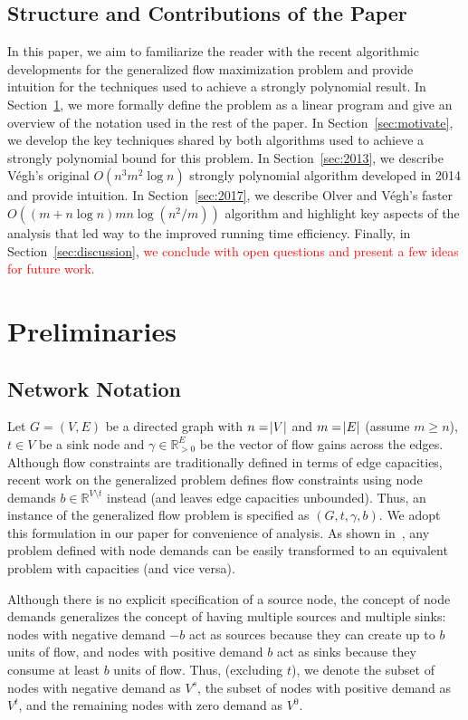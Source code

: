 \documentclass[11pt]{article}
\theoremstyle{definition}
\theoremstyle{definition}
\theoremstyle{definition}
\newcommand{\R}{\mathbb{R}}
\newcommand{\vsrc}{V^{s}}
\newcommand{\vsink}{V^{t}}
\newcommand{\vz}{V^{0}}
\newcommand{\rewrite}[1]{\textcolor{red}{#1}}
\begin{document}
	\subsection{Structure and Contributions of the Paper}\label{sec:structure}
	In this paper, we aim to
	familiarize the reader with the recent algorithmic developments for the
	generalized flow maximization problem and provide intuition for the techniques
	used to achieve a strongly polynomial result. In Section~\ref{sec:prelim}, we more formally
	define the problem as a linear program and give an overview of the notation
	used in the rest of the paper. In Section~\ref{sec:motivate}, we develop the key techniques
	shared by both algorithms used to achieve a strongly polynomial bound for this
	problem. In Section~\ref{sec:2013}, we describe Végh's original $O(n^3m^2 \log n)$ strongly
	polynomial algorithm developed in 2014 and provide intuition. In Section~\ref{sec:2017}, we describe Olver and
	Végh's faster $O((m + n\log n)mn\log(n^2 / m))$ algorithm and highlight key
	aspects of the analysis that led way to the improved running time efficiency.
	Finally, in Section~\ref{sec:discussion}, 
    \rewrite{we conclude with open questions and present a few ideas
	for future work.}
    
\section{Preliminaries}\label{sec:prelim}

	\subsection{Network Notation}\label{sec:notation}
	Let $G=(V,E)$ be a directed graph with $n=\abs{V}$ and $m=\abs{E}$ (assume
	$m \geq n$), $t \in V$ be a sink node and $\gamma \in \R_{>0}^E$ be the vector of flow gains
	across the edges. Although flow constraints are traditionally defined in terms of
	edge capacities, recent work on the generalized problem defines flow
	constraints using node demands $b \in \R^{V \setminus t}$ instead (and leaves
	edge capacities unbounded). Thus, an instance of the generalized flow problem
	is specified as $(G, t, \gamma, b)$.
	We adopt this formulation in our paper for
	convenience of analysis. As shown in~\cite{Vegh2013}, any problem defined with
	node demands can be easily transformed to an equivalent problem with
	capacities (and vice versa). 

	Although there is no explicit specification of a source node, the concept of
	node demands generalizes the concept of having multiple sources and multiple
	sinks: nodes with negative demand $-b$ act as sources because they can create
	up to $b$ units of flow, and nodes with positive demand $b$ act as sinks 
	because they consume at least $b$ units of flow. Thus, (excluding $t$), we denote the subset of
	nodes with negative demand as $\vsrc$, the subset of nodes with positive
	demand as $\vsink$, and the remaining nodes with zero demand as $\vz$.
\end{document}
